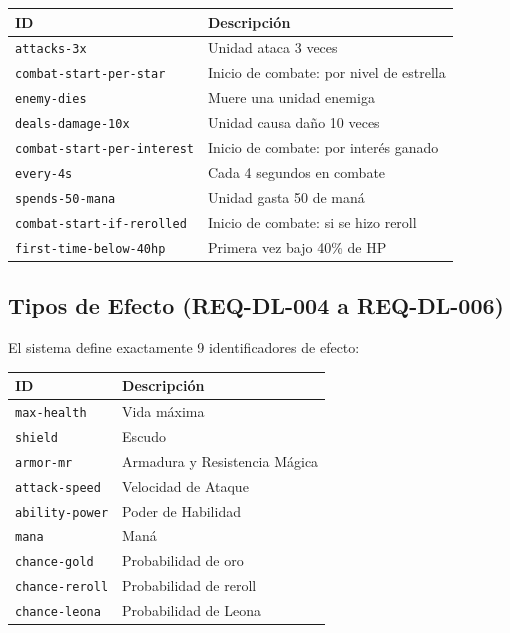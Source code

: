 \documentclass[11pt,a4paper]{report}
\begin{document}
\begin{table}[h]
\centering
\small
\begin{tabular}{@{}ll@{}}
\toprule
\textbf{ID} & \textbf{Descripción} \\
\midrule
\texttt{attacks-3x} & Unidad ataca 3 veces \\
\texttt{combat-start-per-star} & Inicio de combate: por nivel de estrella \\
\texttt{enemy-dies} & Muere una unidad enemiga \\
\texttt{deals-damage-10x} & Unidad causa daño 10 veces \\
\texttt{combat-start-per-interest} & Inicio de combate: por interés ganado \\
\texttt{every-4s} & Cada 4 segundos en combate \\
\texttt{spends-50-mana} & Unidad gasta 50 de maná \\
\texttt{combat-start-if-rerolled} & Inicio de combate: si se hizo reroll \\
\texttt{first-time-below-40hp} & Primera vez bajo 40\% de HP \\
\bottomrule
\end{tabular}
\end{table}

\subsection{Tipos de Efecto (REQ-DL-004 a REQ-DL-006)}

El sistema define exactamente 9 identificadores de efecto:

\begin{table}[h]
\centering
\small
\begin{tabular}{@{}ll@{}}
\toprule
\textbf{ID} & \textbf{Descripción} \\
\midrule
\texttt{max-health} & Vida máxima \\
\texttt{shield} & Escudo \\
\texttt{armor-mr} & Armadura y Resistencia Mágica \\
\texttt{attack-speed} & Velocidad de Ataque \\
\texttt{ability-power} & Poder de Habilidad \\
\texttt{mana} & Maná \\
\texttt{chance-gold} & Probabilidad de oro \\
\texttt{chance-reroll} & Probabilidad de reroll \\
\texttt{chance-leona} & Probabilidad de Leona \\
\bottomrule
\end{tabular}
\end{table}
\end{document}
